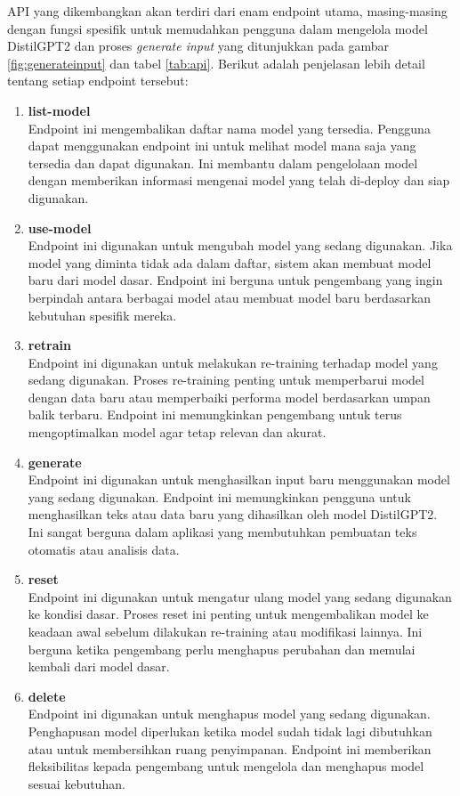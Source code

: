 API yang dikembangkan akan terdiri dari enam endpoint utama, masing-masing 
dengan fungsi spesifik untuk memudahkan pengguna dalam mengelola model 
DistilGPT2 dan proses \emph{generate input} yang ditunjukkan pada 
gambar \ref{fig:generateinput} dan tabel \ref{tab:api}.
Berikut adalah penjelasan lebih 
detail tentang setiap endpoint tersebut:

\begin{enumerate}[topsep=0pt, itemsep=0pt]
    \item \textbf{list-model}\\
    Endpoint ini mengembalikan daftar nama model yang tersedia. Pengguna dapat menggunakan endpoint ini untuk melihat model mana saja yang tersedia dan dapat digunakan. Ini membantu dalam pengelolaan model dengan memberikan informasi mengenai model yang telah di-deploy dan siap digunakan.
    
    \item \textbf{use-model}\\
    Endpoint ini digunakan untuk mengubah model yang sedang digunakan. Jika model yang diminta tidak ada dalam daftar, sistem akan membuat model baru dari model dasar. Endpoint ini berguna untuk pengembang yang ingin berpindah antara berbagai model atau membuat model baru berdasarkan kebutuhan spesifik mereka.
    
    \item \textbf{retrain}\\
    Endpoint ini digunakan untuk melakukan re-training terhadap model yang sedang digunakan. Proses re-training penting untuk memperbarui model dengan data baru atau memperbaiki performa model berdasarkan umpan balik terbaru. Endpoint ini memungkinkan pengembang untuk terus mengoptimalkan model agar tetap relevan dan akurat.
    
    \item \textbf{generate}\\
    Endpoint ini digunakan untuk menghasilkan input baru menggunakan model yang sedang digunakan. Endpoint ini memungkinkan pengguna untuk menghasilkan teks atau data baru yang dihasilkan oleh model DistilGPT2. Ini sangat berguna dalam aplikasi yang membutuhkan pembuatan teks otomatis atau analisis data.
    
    \item \textbf{reset}\\
    Endpoint ini digunakan untuk mengatur ulang model yang sedang digunakan ke kondisi dasar. Proses reset ini penting untuk mengembalikan model ke keadaan awal sebelum dilakukan re-training atau modifikasi lainnya. Ini berguna ketika pengembang perlu menghapus perubahan dan memulai kembali dari model dasar.
    
    \item \textbf{delete}\\
    Endpoint ini digunakan untuk menghapus model yang sedang digunakan. Penghapusan model diperlukan ketika model sudah tidak lagi dibutuhkan atau untuk membersihkan ruang penyimpanan. Endpoint ini memberikan fleksibilitas kepada pengembang untuk mengelola dan menghapus model sesuai kebutuhan.
\end{enumerate}

